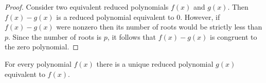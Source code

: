 \begin{proof}
  Consider two equivalent reduced polynomials $f(x)$ and $g(x)$. Then $f(x)-g(x)$ is a reduced polynomial equivalent to $0$. However, if $f(x)-g(x)$ were nonzero then its number of roots would be strictly less than $p$. Since the number of roots is $p$, it follows that $f(x)-g(x)$ is congruent to the zero polynomial.
\end{proof}

\begin{theorem}
  For every polynomial $f(x)$ there is a unique reduced polynomial $g(x)$ equivalent to $f(x)$.
\end{theorem}

